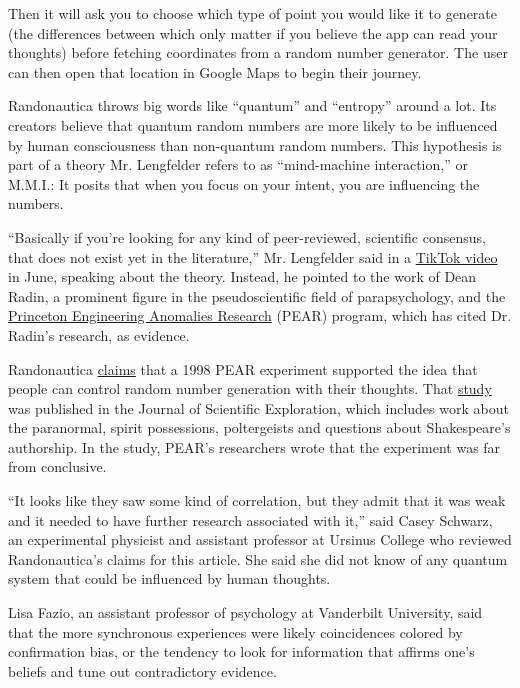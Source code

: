 Then it will ask you to choose which type of point you would like it to
generate (the differences between which only matter if you believe the
app can read your thoughts) before fetching coordinates from a random
number generator. The user can then open that location in Google Maps to
begin their journey.

Randonautica throws big words like ``quantum'' and ``entropy'' around a
lot. Its creators believe that quantum random numbers are more likely to
be influenced by human consciousness than non-quantum random numbers.
This hypothesis is part of a theory Mr. Lengfelder refers to as
``mind-machine interaction,'' or M.M.I.: It posits that when you focus
on your intent, you are influencing the numbers.

``Basically if you're looking for any kind of peer-reviewed, scientific
consensus, that does not exist yet in the literature,'' Mr. Lengfelder
said in a \href{https://vm.tiktok.com/JF7gotD/}{TikTok video} in June,
speaking about the theory. Instead, he pointed to the work of Dean
Radin, a prominent figure in the pseudoscientific field of
parapsychology, and the
\href{https://www.nytimes.com/2003/03/09/nyregion/mind-over-matter.html?searchResultPosition=1}{Princeton
Engineering Anomalies Research} (PEAR) program, which has cited Dr.
Radin's research, as evidence.

Randonautica
\href{https://old.reddit.com/r/randonauts/wiki/theory}{claims} that a
1998 PEAR experiment supported the idea that people can control random
number generation with their thoughts. That
\href{http://noosphere.princeton.edu/papers/pear/fieldreg2.pdf}{study}
was published in the Journal of Scientific Exploration, which includes
work about the paranormal, spirit possessions, poltergeists and
questions about Shakespeare's authorship. In the study, PEAR's
researchers wrote that the experiment was far from conclusive.

``It looks like they saw some kind of correlation, but they admit that
it was weak and it needed to have further research associated with it,''
said Casey Schwarz, an experimental physicist and assistant professor at
Ursinus College who reviewed Randonautica's claims for this article. She
said she did not know of any quantum system that could be influenced by
human thoughts.

Lisa Fazio, an assistant professor of psychology at Vanderbilt
University, said that the more synchronous experiences were likely
coincidences colored by confirmation bias, or the tendency to look for
information that affirms one's beliefs and tune out contradictory
evidence.

